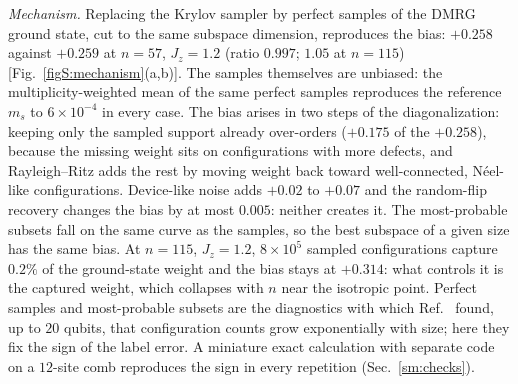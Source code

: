 \documentclass[aps,prx,onecolumn,10pt,nofootinbib,longbibliography,floatfix]{revtex4-2}
\theoremstyle{remark}
\newcommand{\Jz}{J_z}
\newcommand{\ms}{m_s}
\begin{document}
\emph{Mechanism.} Replacing the Krylov sampler by perfect samples of the DMRG ground state, cut to the same subspace
dimension, reproduces the bias: $+0.258$ against $+0.259$ at $n=57$, $\Jz=1.2$ (ratio $0.997$; $1.05$ at $n=115$) %
[Fig.~\ref{figS:mechanism}(a,b)]. The samples themselves are unbiased: the multiplicity-weighted mean of the same
perfect samples reproduces the reference $\ms$ to $6\times10^{-4}$ in every case. The bias arises in two steps of the %
diagonalization: keeping only the sampled support already over-orders ($+0.175$ of the $+0.258$), because the %
missing weight sits on configurations with more defects, and Rayleigh--Ritz adds the rest by moving weight back
toward well-connected, N\'eel-like configurations. Device-like noise adds $+0.02$ to $+0.07$ and the random-flip %
recovery changes the bias by at most $0.005$: neither creates it. The most-probable subsets fall on the same curve as %
the samples, so the best subspace of a given size has the same bias. At $n=115$, $\Jz=1.2$, $8\times10^5$ sampled %
configurations capture $0.2\%$ of the ground-state weight and the bias stays at $+0.314$: what controls it is the %
captured weight, which collapses with $n$ near the isotropic point. Perfect samples and most-probable subsets are
the diagnostics with which Ref.~\cite{gaberle2026} found, up to $20$ qubits, that configuration counts grow exponentially with size; %
here they fix the sign of the label error. A miniature exact calculation with separate code on a $12$-site comb reproduces %
the sign in every repetition (Sec.~\ref{sm:checks}).
\end{document}
